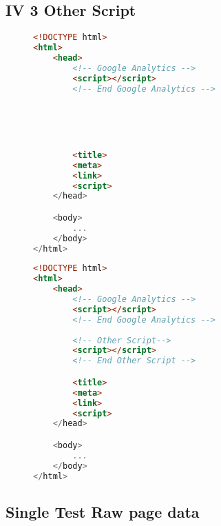 \subsection{IV 3 Other Script}

\begin{sidewaysfigure}
\begin{multicols}{2}
\begin{center}
\begin{lstlisting}[caption={Other Script 1}, language=html, numbers=none]
<!DOCTYPE html>
<html>
    <head>
        <!-- Google Analytics -->
        <script></script>
        <!-- End Google Analytics -->
        




        <title>
        <meta>
        <link>
        <script>
    </head>

    <body>
        ...
    </body>
</html>
\end{lstlisting}
\end{center}

\columnbreak

\begin{center}
\begin{lstlisting}[caption={Other Script 2}, language=html, numbers=none]
<!DOCTYPE html>
<html>
    <head>
        <!-- Google Analytics -->
        <script></script>
        <!-- End Google Analytics -->
        
        <!-- Other Script-->
        <script></script>
        <!-- End Other Script -->

        <title>
        <meta>
        <link>
        <script>
    </head>

    <body>
        ...
    </body>
</html>
\end{lstlisting}
\end{center}
\end{multicols}
\end{sidewaysfigure}





\subsection{Single Test Raw page data}

